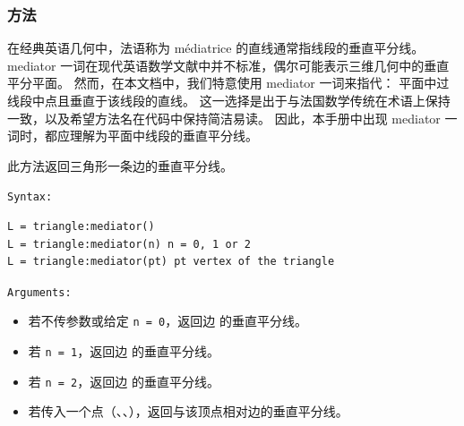 \begin{tkzexample}[latex=.5\textwidth]
\begin{center}
\end{center}
\end{tkzexample}

\subsubsection{方法 }
\label{ssub:triangle_mediator}
在经典英语几何中，法语称为 médiatrice 的直线通常指线段的垂直平分线。
mediator 一词在现代英语数学文献中并不标准，偶尔可能表示三维几何中的垂直平分平面。
然而，在本文档中，我们特意使用 mediator 一词来指代：
平面中过线段中点且垂直于该线段的直线。
这一选择是出于与法国数学传统在术语上保持一致，以及希望方法名在代码中保持简洁易读。
因此，本手册中出现 mediator 一词时，都应理解为平面中线段的垂直平分线。


此方法返回三角形一条边的垂直平分线。

\texttt{Syntax: }

\begin{verbatim}
L = triangle:mediator()
L = triangle:mediator(n) n = 0, 1 or 2
L = triangle:mediator(pt) pt vertex of the triangle
\end{verbatim}

\texttt{Arguments: }

\begin{itemize}
  \item 若不传参数或给定 \texttt{n = 0}，返回边  的垂直平分线。
  \item 若 \texttt{n = 1}，返回边  的垂直平分线。
  \item 若 \texttt{n = 2}，返回边  的垂直平分线。
  \item 若传入一个点（、、），返回与该顶点相对边的垂直平分线。
\end{itemize}


